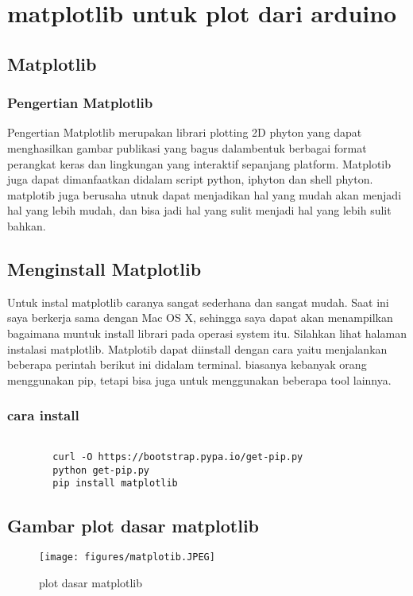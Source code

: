
\section {matplotlib untuk plot dari arduino}

\subsection {Matplotlib}
\subsubsection {Pengertian Matplotlib}
	Pengertian Matplotlib merupakan librari plotting 2D phyton yang dapat menghasilkan gambar publikasi yang bagus dalambentuk berbagai format perangkat keras dan lingkungan yang interaktif sepanjang platform. Matplotib juga dapat dimanfaatkan didalam script python, iphyton dan shell phyton. matplotib juga berusaha utnuk dapat menjadikan hal yang mudah akan menjadi hal yang lebih mudah, dan bisa jadi hal yang sulit menjadi hal yang lebih sulit bahkan.
	
\subsection {Menginstall Matplotlib}
	Untuk instal matplotlib caranya sangat sederhana dan sangat mudah. Saat ini saya berkerja sama dengan Mac OS X, sehingga saya dapat akan menampilkan bagaimana muntuk install librari pada operasi system itu. Silahkan lihat halaman instalasi matplotlib.	Matplotib dapat diinstall dengan cara yaitu menjalankan beberapa perintah berikut ini didalam terminal. biasanya kebanyak orang menggunakan pip, tetapi bisa juga untuk menggunakan beberapa tool lainnya.

	\subsubsection{cara install}
	\begin{verbatim} 
	
		curl -O https://bootstrap.pypa.io/get-pip.py
		python get-pip.py
		pip install matplotlib

	\end{verbatim}
	
\subsection {Gambar plot dasar matplotlib}
	\begin{figure}[ht]
	\centerline{\texttt{[image: figures/matplotib.JPEG]}}
	\caption{plot dasar matplotlib}
	\label{Gambar}
	\end{figure}
      
